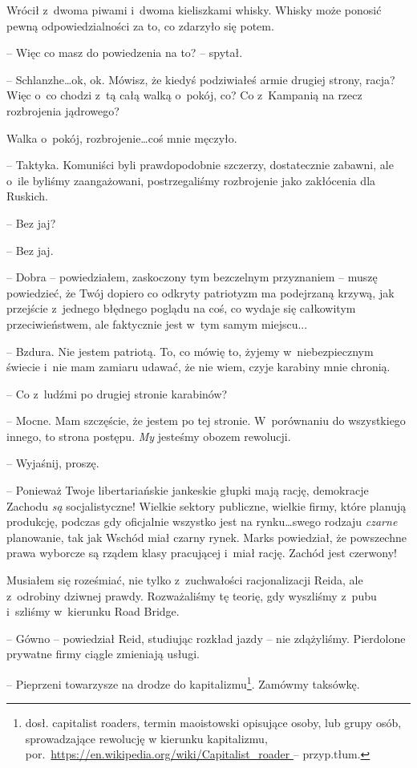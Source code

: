 \documentclass[oneside,polish,11pt,sfheadings]{mwbk}
\begin{document}
Wrócił z~dwoma piwami i~dwoma kieliszkami whisky. Whisky może ponosić
pewną odpowiedzialności za to, co zdarzyło się potem.

-- Więc co masz do powiedzenia na to? -- spytał.

-- Schlanzhe\ldots ok, ok. Mówisz, że kiedyś podziwiałeś armie drugiej
strony, racja? Więc o~co chodzi z~tą całą walką o~pokój, co? Co z~Kampanią na rzecz rozbrojenia jądrowego?

Walka o~pokój, rozbrojenie\ldots coś mnie męczyło.

-- Taktyka. Komuniści byli prawdopodobnie szczerzy, dostatecznie zabawni,
ale o~ile byliśmy zaangażowani, postrzegaliśmy rozbrojenie jako
zakłócenia dla Ruskich.

-- Bez jaj?

-- Bez jaj.

-- Dobra -- powiedziałem, zaskoczony tym bezczelnym przyznaniem -- muszę
powiedzieć, że Twój dopiero co odkryty patriotyzm ma podejrzaną krzywą,
jak przejście z~jednego błędnego poglądu na coś, co wydaje się
całkowitym przeciwieństwem, ale faktycznie jest w~tym samym miejscu...

-- Bzdura. Nie jestem patriotą. To, co mówię to, żyjemy w~niebezpiecznym
świecie i~nie mam zamiaru udawać, że nie wiem, czyje karabiny mnie
chronią.

-- Co z~ludźmi po drugiej stronie karabinów?

-- Mocne. Mam szczęście, że jestem po tej stronie. W~porównaniu do
wszystkiego innego, to strona postępu. \emph{My} jesteśmy obozem
rewolucji.

-- Wyjaśnij, proszę.

-- Ponieważ Twoje libertariańskie jankeskie głupki mają rację, demokracje
Zachodu \emph{są} socjalistyczne! Wielkie sektory publiczne, wielkie
firmy, które planują produkcję, podczas gdy oficjalnie wszystko jest na
rynku\ldots swego rodzaju \emph{czarne} planowanie, tak jak Wschód miał
czarny rynek. Marks powiedział, że powszechne prawa wyborcze są rządem
klasy pracującej i~miał rację. Zachód jest czerwony!

Musiałem się roześmiać, nie tylko z~zuchwałości racjonalizacji Reida,
ale z~odrobiny dziwnej prawdy. Rozważaliśmy tę teorię, gdy wyszliśmy z~pubu i~szliśmy w~kierunku Road Bridge.

-- Gówno -- powiedział Reid, studiując rozkład jazdy -- nie zdążyliśmy.
Pierdolone prywatne firmy ciągle zmieniają usługi.

-- Pieprzeni towarzysze na drodze do kapitalizmu\footnote{dosł. capitalist
roaders, termin maoistowski opisujące osoby, lub grupy osób, sprowadzające rewolucję
w kierunku kapitalizmu, por.~\url{https://en.wikipedia.org/wiki/Capitalist_roader } -- przyp.tłum.}. Zamówmy taksówkę.
\end{document}
